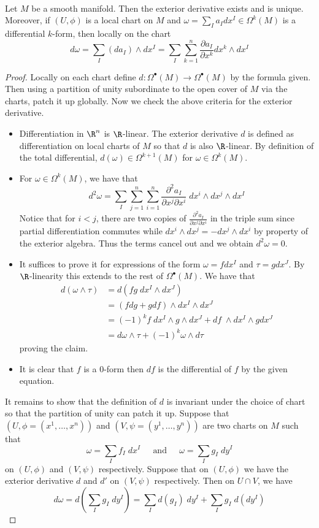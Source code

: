 \documentclass[a4paper]{article}
\begin{document}
\begin{prp}{}{}\\
Let $M$ be a smooth manifold. Then the exterior derivative exists and is unique. Moreover, if $(U,\phi)$ is a local chart on $M$ and $\omega=\sum_Ia_Idx^I\in\Omega^k(M)$ is a differential $k$-form, then locally on the chart $$d\omega=\sum_I(da_I)\wedge dx^I=\sum_I\sum_{k=1}^n\frac{\partial a_I}{\partial x^k}dx^k\wedge dx^I$$ 
\begin{proof}
Locally on each chart define $d:\Omega^\bullet(M)\to\Omega^\bullet(M)$ by the formula given. Then using a partition of unity subordinate to the open cover of $M$ via the charts, patch it up globally. Now we check the above criteria for the exterior derivative. 

\begin{itemize}
\item Differentiation in $\R^n$ is $\R$-linear. The exterior derivative $d$ is defined as differentiation on local charts of $M$ so that $d$ is also $\R$-linear. By definition of the total differential, $d(\omega)\in\Omega^{k+1}(M)$ for $\omega\in\Omega^k(M)$. 
\item For $\omega\in\Omega^k(M)$, we have that $$d^2\omega=\sum_I\sum_{j=1}^n\sum_{i=1}^n\frac{\partial^2 a_I}{\partial x^j\partial x^i}\;dx^i\wedge dx^j\wedge dx^I$$ Notice that for $i<j$, there are two copies of $\frac{\partial^2 a_I}{\partial x^j\partial x^i}$ in the triple sum since partial differentiation commutes while $dx^i\wedge dx^j=-dx^j\wedge dx^i$ by property of the exterior algebra. Thus the terms cancel out and we obtain $d^2\omega=0$. 
\item It suffices to prove it for expressions of the form $\omega=fdx^I$ and $\tau=gdx^J$. By $\R$-linearity this extends to the rest of $\Omega^\bullet(M)$. We have that 
\begin{align*}
d(\omega\wedge\tau)&=d(fg\;dx^I\wedge dx^J)\\
&=(fdg+gdf)\wedge dx^I\wedge dx^J\\
&=(-1)^kf\;dx^I\wedge g\wedge dx^J+df\;\wedge dx^I\wedge gdx^J\\
&=d\omega\wedge\tau+(-1)^k\omega\wedge d\tau
\end{align*}
proving the claim. 
\item It is clear that $f$ is a $0$-form then $df$ is the differential of $f$ by the given equation. 
\end{itemize}
It remains to show that the definition of $d$ is invariant under the choice of chart so that the partition of unity can patch it up. Suppose that $(U,\phi=(x^1,\dots,x^n))$ and $(V,\psi=(y^1,\dots,y^n))$ are two charts on $M$ such that $$\omega=\sum_If_I\;dx^I\;\;\;\;\text{ and }\;\;\;\;\omega=\sum_Ig_I\;dy^I$$ on $(U,\phi)$ and $(V,\psi)$ respectively. Suppose that on $(U,\phi)$ we have the exterior derivative $d$ and $d'$ on $(V,\psi)$ respectively. Then on $U\cap V$, we have $$d\omega=d\left(\sum_Ig_I\;dy^I\right)=\sum_Id(g_I)\;dy^I+\sum_Ig_I\;d(dy^I)$$

\end{proof}
\end{prp}
\end{document}
